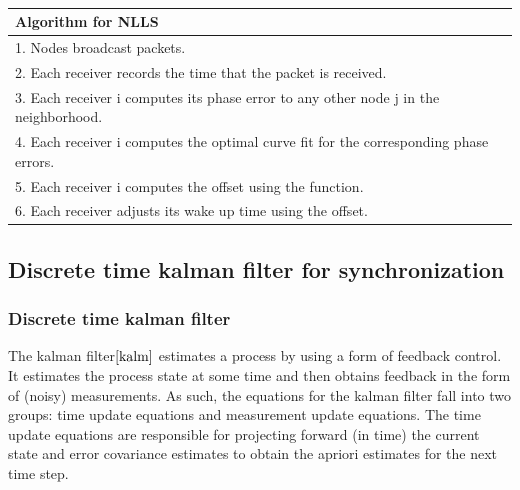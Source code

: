 \documentclass[a4paper,10pt]{report}
\begin{document}
\paragraph*{}
\begin{tabular}{  l }Algorithm for NLLS \\\hline \hline
1. Nodes broadcast packets. \\  2. Each receiver records the time that the packet is received. \\
3. Each receiver i computes its phase error to any other node j in the neighborhood. \\
4. Each receiver i computes the optimal curve fit for the corresponding phase errors. \\
5. Each receiver i computes the offset using the function. \\
6. Each receiver adjusts its wake up time using the offset.\\
\hline \hline
\end{tabular}
\subsection{\textbf{Discrete time kalman filter for synchronization}}
\subsubsection{Discrete time kalman filter}
The kalman filter$\cite{kalm}$ estimates a process by using a form of feedback control. It estimates the process state at some time and then obtains feedback in the form of (noisy) measurements. As such, the equations for the kalman filter fall into two groups: time
update equations and measurement update equations. The time update equations are responsible for projecting forward (in time) the
current state and error covariance estimates to obtain the apriori estimates for the next time step.
\end{document}
